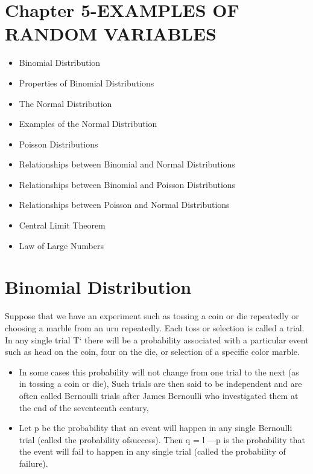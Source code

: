 \section*{Chapter 5-EXAMPLES OF RANDOM VARIABLES}

\begin{itemize}
\item Binomial Distribution
\item Properties of Binomial Distributions
\item The Normal Distribution
\item Examples of the Normal Distribution
\item Poisson Distributions
\item Relationships between Binomial and
Normal Distributions
\item Relationships between Binomial and
Poisson Distributions
\item Relationships between Poisson and
Normal Distributions
\item Central Limit Theorem
\item Law of Large Numbers
\end{itemize}


\newpage
\section*{Binomial Distribution}
Suppose that we have an experiment such as tossing a coin or die repeatedly or choosing a %
marble from an urn repeatedly. Each toss or selection is called a trial. In any single trial T‘
there will be a probability associated with a particular event such as head on the coin, four
on the die, or selection of a speciﬁc color marble. 
\begin{itemize}
\item In some cases this probability will not
change from one trial to the next (as in tossing
a coin or die), Such trials are then said to be independent and are often
called Bernoulli trials after James Bernoulli who investigated them at
the end of the seventeenth century,
\item Let p be the probability that an event will happen in any single
Bernoulli trial (called the probability ofsuccess). Then q = l —p is the
probability that the event will fail to happen in any single trial (called
the probability of failure).
\end{itemize}

